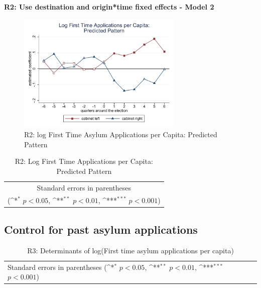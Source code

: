 \documentclass[10pt,a4paper]{scrartcl}
\begin{document}
\clearpage
\textbf{R2: Use destination and origin*time fixed effects - Model 2}
\begin{figure}[!ht]
	\centering
	\includegraphics[width=0.7\textwidth]{figures_edited/app_graph2_R2.pdf}
	\caption{R2: log First Time Asylum Applications per Capita: Predicted Pattern}
\end{figure}

\begin{table}[!ht]\centering
	\footnotesize
	\renewcommand{\arraystretch}{1.2}
	\def\sym#1{\ifmmode^{#1}\else\(^{#1}\)\fi}
	\caption{R2: Log First Time Applications per Capita: Predicted Pattern}
	\begin{tabular}{l*{2}{c}}
		\hline\hline
		
		\hline\hline
		\multicolumn{3}{c}{\footnotesize Standard errors in parentheses} \\
		\multicolumn{3}{c}{\footnotesize (\sym{*} \(p<0.05\), \sym{**} \(p<0.01\), \sym{***} \(p<0.001\))}\\
	\end{tabular}
\end{table}




\clearpage
\FloatBarrier
\subsection{Control for past asylum applications}
\begin{table}[!ht]\centering
	\renewcommand{\arraystretch}{1.25}
	\small
	\def\sym#1{\ifmmode^{#1}\else\(^{#1}\)\fi}
	\caption{R3: Determinants of log(First time asylum applications per capita)}
	\begin{tabular}{l*{3}{c}}
		\hline\hline
		
		\hline\hline
		\multicolumn{4}{l}{\footnotesize Standard errors in parentheses (\sym{*} \(p<0.05\), \sym{**} \(p<0.01\), \sym{***} \(p<0.001\))}\\
	\end{tabular}
\end{table}
\end{document}
